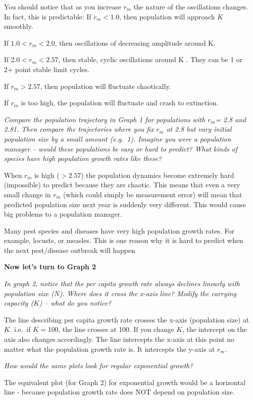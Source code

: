 \documentclass[
  a4paper]{book}
\begin{document}
You should notice that as you increase \(r_m\) the nature of the oscillations changes. In fact, this is predictable: If \(r_m < 1.0\), then population will approach \(K\) smoothly.

If \(1.0 < r_m < 2.0\), then oscillations of decreasing amplitude around K.

If \(2.0< r_m < 2.57\), then stable, cyclic oscillations around K . They can be 1 or 2+ point stable limit cycles.

If \(r_m > 2.57\), then population will fluctuate chaotically.

If \(r_m\) is too high, the population will fluctuate and crash to extinction.

\emph{Compare the population trajectory in Graph 1 for populations with \(r_m\)= 2.8 and 2.81. Then compare the trajectories where you fix \(r_m\) at 2.8 but vary initial population size by a small amount (e.g.~1). Imagine you were a population manager -- would these populations be easy or hard to predict? What kinds of species have high population growth rates like these?}

When \(r_m\) is high (\(>2.57\)) the population dynamics become extremely hard (impossible) to predict because they are chaotic. This means that even a very small change in \(r_m\) (which could simply be measurement error) will mean that predicted population size next year is suddenly very different. This would cause big problems to a population manager.

Many pest species and diseases have very high population growth rates. For example, locusts, or measles. This is one reason why it is hard to predict when the next pest/disease outbreak will happen

\textbf{Now let's turn to Graph 2}

\emph{In graph 2, notice that the per capita growth rate always declines linearly with population size (\(N\)). Where does it cross the x-axis line? Modify the carrying capacity (\(K\)) -- what do you notice?}

The line describing per capita growth rate crosses the x-axis (population size) at \(K\). i.e.~if \(K = 100\), the line crosses at 100. If you change \(K\), the intercept on the axis also changes accordingly. The line intercepts the x-axis at this point no matter what the population growth rate is. It intercepts the y-axis at \(r_m\).

\emph{How would the same plots look for regular exponential growth?}

The equivalent plot (for Graph 2) for exponential growth would be a horizontal line - because population growth rate does NOT depend on population size.
\end{document}
